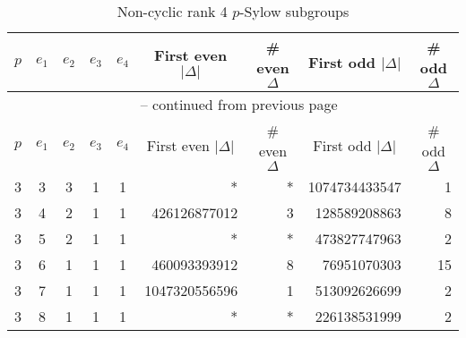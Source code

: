 \documentclass{mcom-l}
\theoremstyle{definition}
\begin{document}
\begin{longtable}[c]{| c | c | c | c | c || r | r | r | r |}
\caption{Non-cyclic rank 4 $p$-Sylow subgroups\label{tab:NC_4_p}}\\

\hline
$p$ & $e_1$	& $e_2$	& $e_3$	& $e_4$	& \multicolumn{1}{c|}{First even $|\Delta|$}		& \multicolumn{1}{c|}{\# even $\Delta$}	& \multicolumn{1}{c|}{First odd $|\Delta|$}	& \multicolumn{1}{c|}{\# odd $\Delta$}\\
\hline
\hline
\endfirsthead

\multicolumn{9}{c}{\normalsize{{\tablename~\thetable{}} -- continued from previous page}} \\
\hline
$p$ & $e_1$	& $e_2$	& $e_3$	& $e_4$	& \multicolumn{1}{c|}{First even $|\Delta|$}		& \multicolumn{1}{c|}{\# even $\Delta$}	& \multicolumn{1}{c|}{First odd $|\Delta|$}	& \multicolumn{1}{c|}{\# odd $\Delta$}\\
\hline
\hline
\endhead

\hline
\endfoot

\hline
\endlastfoot

3	& 3	& 3	& 1	& 1	& *	& *	& 1074734433547	& 1\\
\hline
3	& 4	& 2	& 1	& 1	& 426126877012	& 3	& 128589208863	& 8\\
\hline
3	& 5	& 2	& 1	& 1	& *	& *	& 473827747963	& 2\\
\hline
3	& 6	& 1	& 1	& 1	& 460093393912	& 8	& 76951070303	& 15\\
\hline
3	& 7	& 1	& 1	& 1	& 1047320556596	& 1	& 513092626699	& 2\\
\hline
3	& 8	& 1	& 1	& 1	& *	& *	& 226138531999	& 2\\
\end{longtable}
\end{document}
